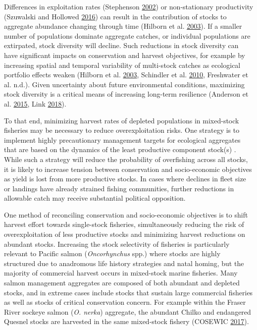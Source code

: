\documentclass[11pt]{book}
\begin{document}
Differences in exploitation rates (Stephenson \protect\hyperlink{ref-Stephenson2002a}{2002}) or non-stationary productivity (Szuwalski and Hollowed \protect\hyperlink{ref-Szuwalski2016}{2016}) can result in the contribution of stocks to aggregate abundance changing through time (Hilborn et al. \protect\hyperlink{ref-Hilborn2003}{2003}). If a smaller number of populations dominate aggregate catches, or individual populations are extirpated, stock diversity will decline. Such reductions in stock diversity can have significant impacts on conservation and harvest objectives, for example by increasing spatial and temporal variability of multi-stock catches as ecological portfolio effects weaken (Hilborn et al. \protect\hyperlink{ref-Hilborn2003}{2003}, Schindler et al. \protect\hyperlink{ref-Schindler2010}{2010}, Freshwater et al. n.d.). Given uncertainty about future environmental conditions, maximizing stock diversity is a critical means of increasing long-term resilience (Anderson et al. \protect\hyperlink{ref-Anderson2015}{2015}, Link \protect\hyperlink{ref-Link2018}{2018}).

To that end, minimizing harvest rates of depleted populations in mixed-stock fisheries may be necessary to reduce overexploitation risks. One strategy is to implement highly precautionary management targets for ecological aggregates that are based on the dynamics of the least productive component stock(s) . While such a strategy will reduce the probability of overfishing across all stocks, it is likely to increase tension between conservation and socio-economic objectives as yield is lost from more productive stocks. In cases where declines in fleet size or landings have already strained fishing communities, further reductions in allowable catch may receive substantial political opposition.

One method of reconciling conservation and socio-economic objectives is to shift harvest effort towards single-stock fisheries, simultaneously reducing the risk of overexploitation of less productive stocks and minimizing harvest reductions on abundant stocks. Increasing the stock selectivity of fisheries is particularly relevant to Pacific salmon (\emph{Oncorhynchus} spp.) where stocks are highly structured due to anadromous life history strategies and natal homing, but the majority of commercial harvest occurs in mixed-stock marine fisheries. Many salmon management aggregates are composed of both abundant and depleted stocks, and in extreme cases include stocks that sustain large commercial fisheries as well as stocks of critical conservation concern. For example within the Fraser River sockeye salmon (\emph{O. nerka}) aggregate, the abundant Chilko and endangered Quesnel stocks are harvested in the same mixed-stock fishery (COSEWIC \protect\hyperlink{ref-COSEWIC2017}{2017}).
\end{document}
